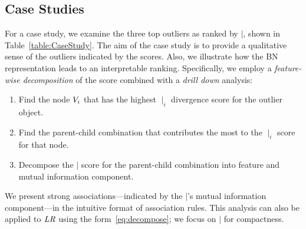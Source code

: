 {							
							
							
							
							
							
							\subsection{Case Studies} \label{sec:CaseStudy} For a case study, we examine the three top outliers as ranked by $\mid$, shown in Table~\ref{table:CaseStudy}. 
							The aim of the case study is to provide a qualitative sense of the outliers indicated by the scores. Also, we illustrate how the BN representation leads to an interpretable ranking. 
							Specifically, we employ a {\em feature-wise decomposition} of the score combined with a {\em drill down} analysis: 
							
							\begin{enumerate}
								\item Find the node $V_{i}$ that has the highest $\mid_{i}$ divergence score for the outlier object. 
								\item Find the parent-child combination that contributes the most to the $\mid_{i}$ score for that node.
								\item Decompose the $\mid$ score for the parent-child combination into feature and mutual information component. 
							\end{enumerate}
							
							We present strong associations---indicated by the $\mid$'s mutual information component---in the intuitive format of association rules. This analysis can also be applied to $\it{LR}$ using the form~\eqref{eq:decompose}; we focus on $\mid$ for compactness.
							
}
